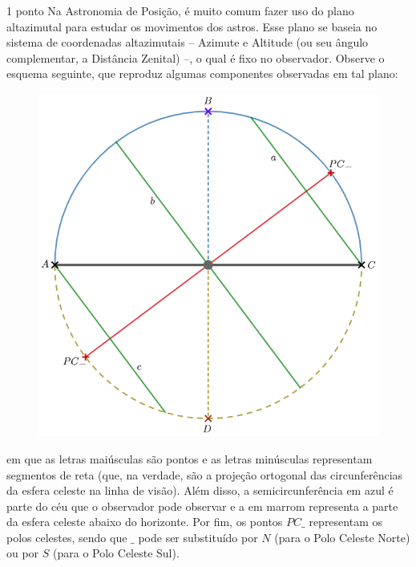 \documentclass{../lista}
\begin{document}

	\begin{questao}{1 ponto}
		Na Astronomia de Posição, é muito comum fazer uso do plano altazimutal para estudar os movimentos dos astros. Esse plano se baseia no sistema de coordenadas altazimutais -- Azimute e Altitude (ou seu ângulo complementar, a Distância Zenital) --, o qual é fixo no observador. Observe o esquema seguinte, que reproduz algumas componentes observadas em tal plano:
		\begin{figure}[H]
			\centering
			\includegraphics[scale=0.5]{./img/1.png}
		\end{figure}
		em que as letras maiúsculas são pontos e as letras minúsculas representam segmentos de reta (que, na verdade, são a projeção ortogonal das circunferências da esfera celeste na linha de visão). Além disso, a semicircunferência em azul é parte do céu que o observador pode observar e a em marrom representa a parte da esfera celeste abaixo do horizonte. Por fim, os pontos $PC\_$ representam os polos celestes, sendo que $\_$ pode ser substituído por $N$ (para o Polo Celeste Norte) ou por $S$ (para o Polo Celeste Sul).


\end{questao}
\end{document}

